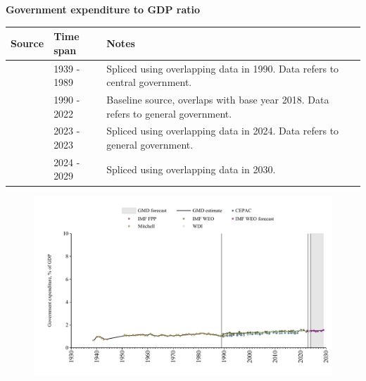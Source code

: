 \documentclass[12pt,a4paper,landscape]{article}
\begin{document}
\begin{adjustbox}{max totalsize={\paperwidth}{\paperheight},center}
\begin{minipage}[t][\textheight][t]{\textwidth}
\vspace*{0.5cm}
{}
\begin{center}
{\Large\bfseries Government expenditure to GDP ratio}
\end{center}
\vspace{0.5cm}
\begin{table}[H]
\centering
\small
\begin{tabular}{|l|l|l|}
\hline
\textbf{Source} & \textbf{Time span} & \textbf{Notes} \\
\hline
\rowcolor{white}\cite{Mitchell}& 1939 - 1989 &Spliced using overlapping data in 1990. Data refers to central government.\\
\rowcolor{lightgray}\cite{IMF_WEO}& 1990 - 2022 &Baseline source, overlaps with base year 2018. Data refers to general government.\\
\rowcolor{white}\cite{WDI}& 2023 - 2023 &Spliced using overlapping data in 2024. Data refers to general government.\\
\rowcolor{lightgray}\cite{IMF_WEO_forecast}& 2024 - 2029 &Spliced using overlapping data in 2030. \\
\hline
\end{tabular}
\end{table}
\begin{figure}[H]
\centering
\includegraphics[width=\textwidth,height=0.6\textheight,keepaspectratio]{graphs/SLV_govexp_GDP.pdf}
\end{figure}
\end{minipage}
\end{adjustbox}
\end{document}
